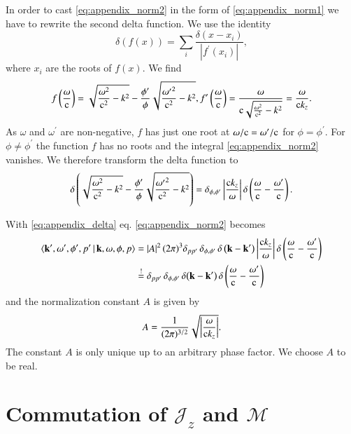In order to cast \eqref{eq:appendix_norm2} in the form of
\eqref{eq:appendix_norm1} we have to rewrite the second delta function. We use
the identity
\begin{equation}
\delta\left(f(x)\right) = \sum_i \frac{\delta\left(x-x_i\right)}{\left|f^\prime(x_i)\right|},
\end{equation}
where $x_i$ are the roots of $f(x)$. We find
\begin{equation}
f\left({\frac{\omega}{\mathrm{c}}}\right) = \sqrt{\frac{\omega^2}{\mathrm{c}^2}-k^2}-\frac{\phi^\prime}{\phi} \sqrt{\frac{{\omega^\prime}^2}{\mathrm{c}^2}-k^2}, \\
f^\prime\left({\frac{\omega}{\mathrm{c}}}\right) = \frac{\omega}{\mathrm{c} \sqrt{\frac{\omega^2}{\mathrm{c}^2}-k^2}} = \frac{\omega}{\mathrm{c} k_z}.
\end{equation}
As $\omega$ and $\omega^\prime$ are non-negative, $f$ has just one
root at $\omega/\mathrm{c} = \omega^\prime/\mathrm{c}$ for $\phi=\phi^\prime$.
For $\phi\ne\phi^\prime$ the function $f$ has no roots and the integral \eqref{eq:appendix_norm2}
vanishes.
We therefore transform the delta function to
\begin{equation}
\label{eq:appendix_delta}
\delta\left(\sqrt{\frac{\omega^2}{\mathrm{c}^2}-k^2}-\frac{\phi^\prime}{\phi}\sqrt{\frac{{\omega^\prime}^2}{\mathrm{c}^2}-k^2}\right) = \delta_{\phi,\phi^\prime} \left|\frac{\mathrm{c} k_z}{\omega}\right| \delta\left(\frac{\omega}{\mathrm{c}}-\frac{\omega^\prime}{\mathrm{c}}\right).
\end{equation}

With \eqref{eq:appendix_delta} eq. \eqref{eq:appendix_norm2} becomes
\begin{align}
\nonumber
\braket{{\mathbf{k}}^\prime, \omega^\prime, \phi^\prime, p^\prime \, | \, {\mathbf{k}}, \omega, \phi, p} &= \left|A\right|^2 (2\pi)^3 \delta_{p p^\prime} \, \delta_{\phi,\phi^\prime} \, \delta\left({\mathbf{k}} - {\mathbf{k}}^\prime\right) \left|\frac{\mathrm{c} k_z}{\omega}\right| \delta\left(\frac{\omega}{\mathrm{c}}-\frac{\omega^\prime}{\mathrm{c}}\right) \\
\nonumber
&\stackrel{!}{=} \delta_{p p^\prime} \, \delta_{\phi,\phi^\prime}\, \delta{\left({\mathbf{k}} - {\mathbf{k}}^\prime\right)} \, \delta\left(\frac{\omega}{\mathrm{c}}-\frac{\omega^\prime}{\mathrm{c}}\right)
\end{align}
and the normalization constant $A$ is given by
\begin{equation}
A = \frac{1}{(2\pi)^{3/2}} \sqrt{\left|\frac{\omega}{\mathrm{c} k_z}\right|}.
\end{equation}
The constant $A$ is only unique up to an arbitrary phase factor. We choose $A$
to be real.

\section{Commutation of $\mathcal{J}_z$ and $\mathcal{M}$}
\label{appendix_conserved_m}

